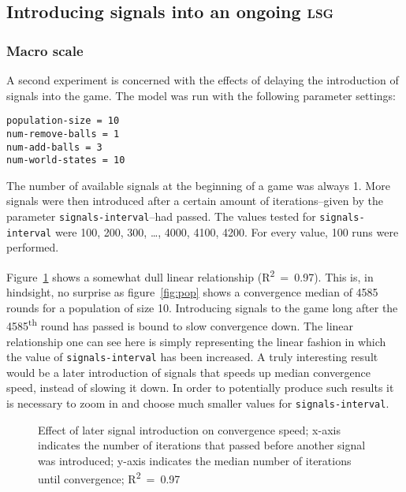 \documentclass[DIV=calc,BCOR=0mm,pagesize]{scrartcl}
\newcommand{\code}[1]{\texttt{#1}}
\newcommand{\lsg}{\textsc{lsg}}
\newcommand{\dash}{–}
\begin{document}
\subsection{Introducing signals into an ongoing \lsg}
\label{ssec:resint}
\subsubsection*{Macro scale}
A second experiment is concerned with the effects of delaying the introduction of signals into the game. The model was run with the following parameter settings:
\begin{verbatim}
population-size = 10
num-remove-balls = 1
num-add-balls = 3
num-world-states = 10
\end{verbatim}
The number of available signals at the beginning of a game was always 1.
More signals were then introduced after a certain amount of iterations\dash given by the parameter \code{signals-interval}\dash had passed.
The values tested for \code{signals-interval} were 100, 200, 300, \ldots, 4000, 4100, 4200.
For every value, 100 runs were performed.

Figure~\ref{fig:sigmacro} shows a somewhat dull linear relationship (R\textsuperscript{2}~=~0.97).
This is, in hindsight, no surprise as figure~\ref{fig:pop} shows a convergence median of 4585 rounds for a population of size 10.
Introducing signals to the game long after the 4585\textsuperscript{th} round has passed is bound to slow convergence down.
The linear relationship one can see here is simply representing the linear fashion in which the value of \code{signals-interval} has been increased.
A truly interesting result would be a later introduction of signals that speeds up median convergence speed, instead of slowing it down.
In order to potentially produce such results it is necessary to zoom in and choose much smaller values for \code{signals-interval}.

\begin{figure}
	\centering
	\caption{Effect of later signal introduction on convergence speed; x-axis indicates the number of iterations that passed before another signal was introduced; y-axis indicates the median number of iterations until convergence; R\textsuperscript{2}~=~0.97}
	\label{fig:sigmacro}
\end{figure}
\end{document}
